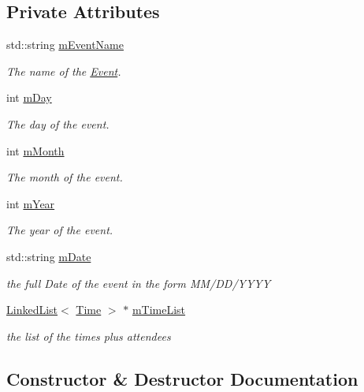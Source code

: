\subsection*{Private Attributes}
\begin{DoxyCompactItemize}
\item 
std\+::string \hyperlink{classEvent_a7d545a7ff5a2e87bb503a80963c9c12e}{m\+Event\+Name}
\begin{DoxyCompactList}\small\item\em The name of the \hyperlink{classEvent}{Event}. \end{DoxyCompactList}\item 
int \hyperlink{classEvent_a605a47d2ab6c0a393d6ab94b82afe3f3}{m\+Day}
\begin{DoxyCompactList}\small\item\em The day of the event. \end{DoxyCompactList}\item 
int \hyperlink{classEvent_a1e481d4c0f234766f61e0ec4fc5170dd}{m\+Month}
\begin{DoxyCompactList}\small\item\em The month of the event. \end{DoxyCompactList}\item 
int \hyperlink{classEvent_ad633cc2ef4fb390c4fb59e835d46e09e}{m\+Year}
\begin{DoxyCompactList}\small\item\em The year of the event. \end{DoxyCompactList}\item 
std\+::string \hyperlink{classEvent_a41ce1327717a5e72513db37c15d4e18a}{m\+Date}
\begin{DoxyCompactList}\small\item\em the full Date of the event in the form M\+M/\+D\+D/\+Y\+Y\+YY \end{DoxyCompactList}\item 
\hyperlink{classLinkedList}{Linked\+List}$<$ \hyperlink{classTime}{Time} $>$ $\ast$ \hyperlink{classEvent_ab5e1ade6acf4c99f4cd1662484bf2e6f}{m\+Time\+List}
\begin{DoxyCompactList}\small\item\em the list of the times plus attendees \end{DoxyCompactList}\end{DoxyCompactItemize}


\subsection{Constructor \& Destructor Documentation}
